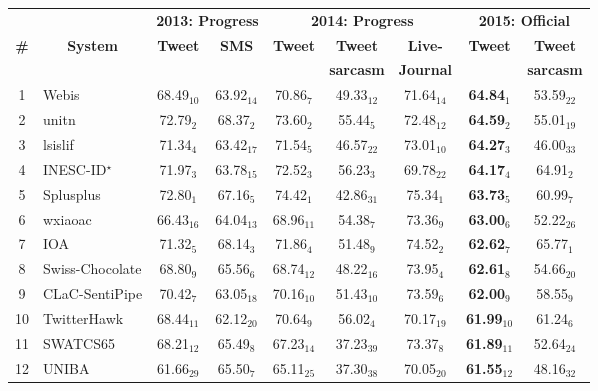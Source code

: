 \documentclass[11pt]{article}
\begin{document}
\begin{table}[t!]
    \centering
    \begin{small}
    \begin{tabular}{c|l|cc|ccc|cc}
    \hline
   & & \multicolumn{2}{c|}{\bf 2013: Progress} & \multicolumn{3}{c|}{\bf 2014: Progress} & \multicolumn{2}{c}{\bf 2015: Official} \\
   \bf \# & \multicolumn{1}{|c|}{\bf System} & \bf Tweet & \bf SMS & \bf Tweet & \bf Tweet & \bf Live- & \bf Tweet & \bf Tweet \\
   & &  &  & \bf & \bf sarcasm & \bf Journal & & \bf sarcasm\\
    \hline
	1 & Webis & 68.49$_{10}$ & 63.92$_{14}$ & 70.86$_{7}$ & 49.33$_{12}$ & 71.64$_{14}$ & \bf 64.84$_{1}$ & 53.59$_{22}$\\
	2 & unitn & 72.79$_{2}$ & 68.37$_{2}$ & 73.60$_{2}$ & 55.44$_{5}$ & 72.48$_{12}$ & \bf 64.59$_{2}$ & 55.01$_{19}$\\
	3 & lsislif & 71.34$_{4}$ & 63.42$_{17}$ & 71.54$_{5}$ & 46.57$_{22}$ & 73.01$_{10}$ & \bf 64.27$_{3}$ & 46.00$_{33}$\\
	4 & INESC-ID$^\star$ & 71.97$_{3}$ & 63.78$_{15}$ & 72.52$_{3}$ & 56.23$_{3}$ & 69.78$_{22}$ & \bf 64.17$_{4}$ & 64.91$_{2}$\\
	5 & Splusplus & 72.80$_{1}$ & 67.16$_{5}$ & 74.42$_{1}$ & 42.86$_{31}$ & 75.34$_{1}$ & \bf 63.73$_{5}$ & 60.99$_{7}$\\
	6 & wxiaoac & 66.43$_{16}$ & 64.04$_{13}$ & 68.96$_{11}$ & 54.38$_{7}$ & 73.36$_{9}$ & \bf 63.00$_{6}$ & 52.22$_{26}$\\
	7 & IOA & 71.32$_{5}$ & 68.14$_{3}$ & 71.86$_{4}$ & 51.48$_{9}$ & 74.52$_{2}$ & \bf 62.62$_{7}$ & 65.77$_{1}$\\
	8 & Swiss-Chocolate & 68.80$_{9}$ & 65.56$_{6}$ & 68.74$_{12}$ & 48.22$_{16}$ & 73.95$_{4}$ & \bf 62.61$_{8}$ & 54.66$_{20}$\\
	9 & CLaC-SentiPipe & 70.42$_{7}$ & 63.05$_{18}$ & 70.16$_{10}$ & 51.43$_{10}$ & 73.59$_{6}$ & \bf 62.00$_{9}$ & 58.55$_{9}$\\
	10 & TwitterHawk & 68.44$_{11}$ & 62.12$_{20}$ & 70.64$_{9}$ & 56.02$_{4}$ & 70.17$_{19}$ & \bf 61.99$_{10}$ & 61.24$_{6}$\\
	11 & SWATCS65 & 68.21$_{12}$ & 65.49$_{8}$ & 67.23$_{14}$ & 37.23$_{39}$ & 73.37$_{8}$ & \bf 61.89$_{11}$ & 52.64$_{24}$\\
	12 & UNIBA & 61.66$_{29}$ & 65.50$_{7}$ & 65.11$_{25}$ & 37.30$_{38}$ & 70.05$_{20}$ & \bf 61.55$_{12}$ & 48.16$_{32}$\\

\end{tabular}
\end{small}
\end{table}
\end{document}
